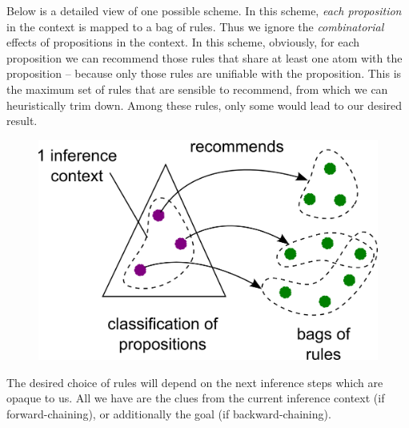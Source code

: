 Below is a detailed view of one possible scheme.  In this scheme, \textit{each proposition} in the context is mapped to a bag of rules.  Thus we ignore the \textit{combinatorial} effects of propositions in the context.  In this scheme, obviously, for each proposition we can recommend those rules that share at least one atom with the proposition -- because only those rules are unifiable with the proposition.  This is the maximum set of rules that are sensible to recommend, from which we can heuristically trim down.  Among these rules, only some would lead to our desired result.
\begin{figure}[H]
\centering
\includegraphics[scale=1]{rule-recommendation.png}
\end{figure}

The desired choice of rules will depend on the next inference steps which are opaque to us.  All we have are the clues from the current inference context (if forward-chaining), or additionally the goal (if backward-chaining).  

\underconst
